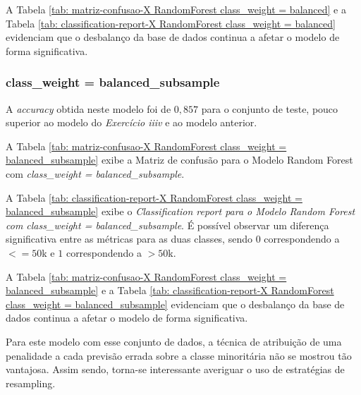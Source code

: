 

A Tabela \ref{tab: matriz-confusao-X RandomForest class_weight = balanced} e a Tabela \ref{tab: classification-report-X RandomForest class_weight = balanced} evidenciam que o desbalanço da base de dados continua a afetar o modelo de forma significativa.

\subsubsection{class\_weight = balanced\_subsample}

A \textit{accuracy} obtida neste modelo foi de $0,857$ para o conjunto de teste, pouco superior ao modelo do \textit{Exercício iiiv} e ao modelo anterior.

A Tabela \ref{tab: matriz-confusao-X RandomForest class_weight = balanced_subsample} exibe a Matriz de confusão para o Modelo Random Forest com \textit{class\_weight = balanced\_subsample}.



A Tabela \ref{tab: classification-report-X RandomForest class_weight = balanced_subsample} exibe o \textit{Classification report para o Modelo Random Forest com class\_weight = balanced\_subsample}. É possível observar um diferença significativa entre as métricas para as duas classes, sendo $0$ correspondendo a $<=50$k e $1$ correspondendo a $>50$k.



A Tabela \ref{tab: matriz-confusao-X RandomForest class_weight = balanced_subsample} e a Tabela \ref{tab: classification-report-X RandomForest class_weight = balanced_subsample} evidenciam que o desbalanço da base de dados continua a afetar o modelo de forma significativa.

Para este modelo com esse conjunto de dados, a técnica de atribuição de uma penalidade a cada previsão errada sobre a classe minoritária não se mostrou tão vantajosa. Assim sendo, torna-se interessante averiguar o uso de estratégias de resampling.
